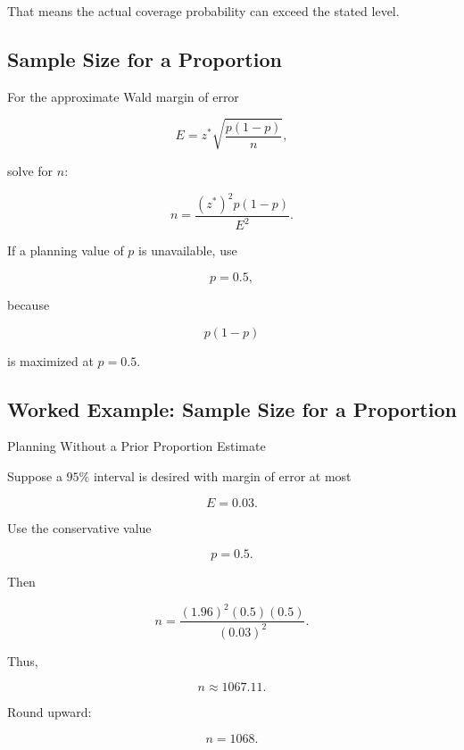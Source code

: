 That means the actual coverage probability can exceed the stated level.

\subsection{Sample Size for a Proportion}
\label{subsec:sample-size-proportion}

For the approximate Wald margin of error

\[
E
=
z^*
\sqrt{
\frac{
p(1-p)
}{n}
},
\]

solve for \(n\):

\[
\boxed{
n
=
\frac{
(z^*)^2p(1-p)
}{
E^2
}.
}
\]

If a planning value of \(p\) is unavailable, use

\[
\boxed{
p=0.5,
}
\]

because

\[
p(1-p)
\]

is maximized at \(p=0.5\).

\subsection{Worked Example: Sample Size for a Proportion}
\label{subsec:worked-proportion-sample-size}

\begin{workedexamplebox}{Planning Without a Prior Proportion Estimate}

Suppose a \(95\%\) interval is desired with margin of error at most

\[
E=0.03.
\]

Use the conservative value

\[
p=0.5.
\]

Then

\[
n
=
\frac{
(1.96)^2(0.5)(0.5)
}{
(0.03)^2
}.
\]

Thus,

\[
n
\approx
1067.11.
\]

Round upward:

\begin{answerbox}
\[
\boxed{
n=1068.
}
\]
\end{answerbox}

\end{workedexamplebox}

